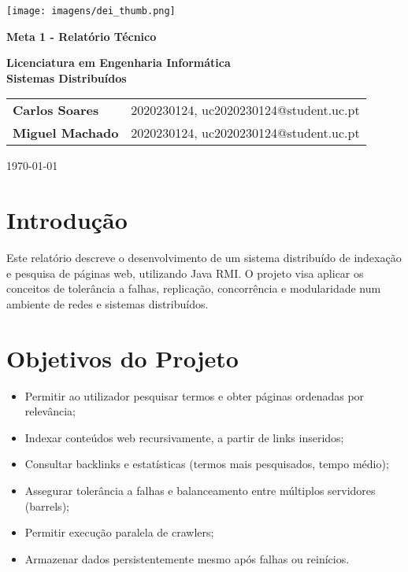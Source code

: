 \documentclass{article}
\begin{document}
\begin{titlepage}
    \centering
    \vspace*{1cm}

    \texttt{[image: imagens/dei\_thumb.png]}

    \vspace{1.5cm}
    {\LARGE \textbf{Meta 1 - Relatório Técnico} \par}
    \vspace{0.5cm}
    \vspace{2.5cm}
    \textbf{Licenciatura em Engenharia Informática} \\
    \textbf{Sistemas Distribuídos}

    \vspace{3cm}
    \begin{tabular}{ll}
        \textbf{Carlos Soares} & 2020230124, uc2020230124@student.uc.pt \\
        \textbf{Miguel Machado} & 2020230124, uc2020230124@student.uc.pt 
    \end{tabular}

    \vfill
    {\large \today \par}
\end{titlepage}

\newpage

\section{Introdução}
Este relatório descreve o desenvolvimento de um sistema distribuído de indexação e pesquisa de páginas web, utilizando Java RMI. O projeto visa aplicar os conceitos de tolerância a falhas, replicação, concorrência e modularidade num ambiente de redes e sistemas distribuídos.

\newpage

\section{Objetivos do Projeto}
\begin{itemize}
    \item Permitir ao utilizador pesquisar termos e obter páginas ordenadas por relevância;
    \item Indexar conteúdos web recursivamente, a partir de links inseridos;
    \item Consultar backlinks e estatísticas (termos mais pesquisados, tempo médio);
    \item Assegurar tolerância a falhas e balanceamento entre múltiplos servidores (barrels);
    \item Permitir execução paralela de crawlers;
    \item Armazenar dados persistentemente mesmo após falhas ou reinícios.
\end{itemize}
\end{document}
